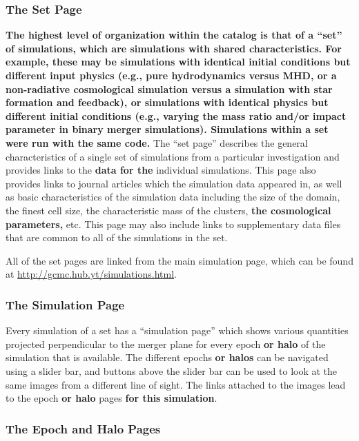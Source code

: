 \documentclass{emulateapj}
\begin{document}
\subsubsection{The Set Page}\label{sec:set_page}

{\bf The highest level of organization within the catalog is that of a ``set'' of simulations, which are simulations with shared characteristics. For example, these may be simulations with identical initial conditions but different input physics (e.g., pure hydrodynamics versus MHD, or a non-radiative cosmological simulation versus a simulation with star formation and feedback), or simulations with identical physics but different initial conditions (e.g., varying the mass ratio and/or impact parameter in binary merger simulations). Simulations within a set were run with the same code.} The ``set page'' describes the general characteristics of a single set of simulations from a particular investigation and provides links to the {\bf data for the} individual simulations. This page also provides links to journal articles which the simulation data appeared in, as well as basic characteristics of the simulation data including the size of the domain, the finest cell size, the characteristic mass of the clusters, {\bf the cosmological parameters,} etc. This page may also include links to supplementary data files that are common to all of the simulations in the set.

All of the set pages are linked from the main simulation page, which can be found at \url{http://gcmc.hub.yt/simulations.html}.

\subsubsection{The Simulation Page}\label{sec:sim_page}

Every simulation of a set has a ``simulation page'' which shows various quantities projected perpendicular to the merger plane for every epoch {\bf or halo} of the simulation that is available. The different epochs {\bf or halos} can be navigated using a slider bar, and buttons above the slider bar can be used to look at the same images from a different line of sight. The links attached to the images lead to the epoch {\bf or halo} pages {\bf for this simulation}.

\subsubsection{The Epoch and Halo Pages}\label{sec:epoch_page}
\end{document}
